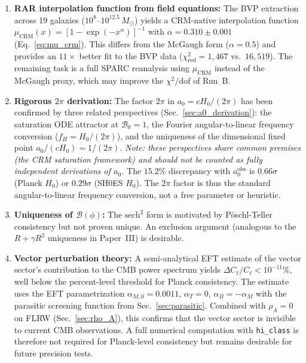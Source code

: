 \documentclass[aps,prd,twocolumn,superscriptaddress,nofootinbib]{revtex4-2}
\begin{document}
\begin{enumerate}
\item \textbf{RAR interpolation function from field equations:} The BVP extraction across 19 galaxies ($10^8$--$10^{12.5}\,M_\odot$) yields a CRM-native interpolation function $\mu_{\mathrm{CRM}}(x) = [1 - \exp(-x^\alpha)]^{-1}$ with $\alpha = 0.310 \pm 0.001$ (Eq.~\ref{eq:mu_crm}). This differs from the McGaugh form ($\alpha = 0.5$) and provides an $11\times$ better fit to the BVP data ($\chi^2_{\mathrm{red}} = 1{,}467$ vs.\ $16{,}519$). The remaining task is a full SPARC reanalysis using $\mu_{\mathrm{CRM}}$ instead of the McGaugh proxy, which may improve the $\chi^2/\mathrm{dof}$ of Run~B.

\item \textbf{Rigorous $2\pi$ derivation:} The factor $2\pi$ in $a_0 = cH_0/(2\pi)$ has been confirmed by three related perspectives (Sec.~\ref{sec:a0_derivation}): the saturation ODE attractor at $\mathcal{B}_0 = 1$, the Fourier angular-to-linear frequency conversion ($f_H = H_0/(2\pi)$), and the uniqueness of the dimensional fixed point $a_0/(cH_0) = 1/(2\pi)$. \textit{Note: these perspectives share common premises (the CRM saturation framework) and should not be counted as fully independent derivations of $a_0$.} The $15.2\%$ discrepancy with $a_0^{\mathrm{obs}}$ is $0.66\sigma$ (Planck $H_0$) or $0.29\sigma$ (SH0ES $H_0$). The $2\pi$ factor is thus the standard angular-to-linear frequency conversion, not a free parameter or heuristic.

\item \textbf{Uniqueness of $\mathcal{B}(\phi)$:} The $\mathrm{sech}^2$ form is motivated by P\"oschl-Teller consistency but not proven unique. An exclusion argument (analogous to the $R + \gamma R^2$ uniqueness in Paper~III) is desirable.

\item \textbf{Vector perturbation theory:} A semi-analytical EFT estimate of the vector sector's contribution to the CMB power spectrum yields $\Delta C_\ell / C_\ell < 10^{-11}\%$, well below the percent-level threshold for Planck consistency. The estimate uses the EFT parametrization $\alpha_{M,0} = 0.0011$, $\alpha_T = 0$, $\alpha_B = -\alpha_M$ with the parasitic screening function from Sec.~\ref{sec:parasitic}. Combined with $\rho_A = 0$ on FLRW (Sec.~\ref{sec:rho_A}), this confirms that the vector sector is invisible to current CMB observations. A full numerical computation with \texttt{hi\_class} is therefore not required for Planck-level consistency but remains desirable for future precision tests.


\end{enumerate}
\end{document}
